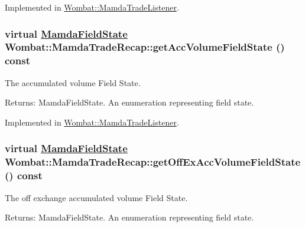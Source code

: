 Implemented in \hyperlink{classWombat_1_1MamdaTradeListener_f79d9119125ef4907ba4227d1176bd04}{Wombat::Mamda\-Trade\-Listener}.\hypertarget{classWombat_1_1MamdaTradeRecap_ee7ddb433c0825515166da7226852b4b}{
\subsubsection[getAccVolumeFieldState]{\setlength{\rightskip}{0pt plus 5cm}virtual \hyperlink{namespaceWombat_93aac974f2ab713554fd12a1fa3b7d2a}{Mamda\-Field\-State} Wombat::Mamda\-Trade\-Recap::get\-Acc\-Volume\-Field\-State () const}}
\label{classWombat_1_1MamdaTradeRecap_ee7ddb433c0825515166da7226852b4b}


The accumulated volume Field State. 

\begin{Desc}
\item[Returns:]Mamda\-Field\-State. An enumeration representing field state. \end{Desc}


Implemented in \hyperlink{classWombat_1_1MamdaTradeListener_48419d9b8e7c932ea3ee9750f2619d2d}{Wombat::Mamda\-Trade\-Listener}.\hypertarget{classWombat_1_1MamdaTradeRecap_84fad7757aecfad7c39e563709091c46}{
\subsubsection[getOffExAccVolumeFieldState]{\setlength{\rightskip}{0pt plus 5cm}virtual \hyperlink{namespaceWombat_93aac974f2ab713554fd12a1fa3b7d2a}{Mamda\-Field\-State} Wombat::Mamda\-Trade\-Recap::get\-Off\-Ex\-Acc\-Volume\-Field\-State () const}}
\label{classWombat_1_1MamdaTradeRecap_84fad7757aecfad7c39e563709091c46}


The off exchange accumulated volume Field State. 

\begin{Desc}
\item[Returns:]Mamda\-Field\-State. An enumeration representing field state. \end{Desc}


